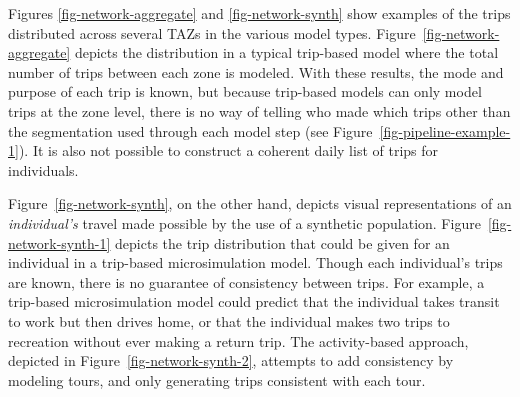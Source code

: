 \documentclass[fancy, twoside, mastersfancy, ms]{byuthesis}
\begin{document}
Figures \ref{fig-network-aggregate} and \ref{fig-network-synth} show
examples of the trips distributed across several TAZs in the various
model types. Figure~\ref{fig-network-aggregate} depicts the distribution
in a typical trip-based model where the total number of trips between
each zone is modeled. With these results, the mode and purpose of each
trip is known, but because trip-based models can only model trips at the
zone level, there is no way of telling who made which trips other than
the segmentation used through each model step (see
Figure~\ref{fig-pipeline-example-1}). It is also not possible to
construct a coherent daily list of trips for individuals.

Figure~\ref{fig-network-synth}, on the other hand, depicts visual
representations of an \emph{individual's} travel made possible by the
use of a synthetic population. Figure~\ref{fig-network-synth-1} depicts
the trip distribution that could be given for an individual in a
trip-based microsimulation model. Though each individual's trips are
known, there is no guarantee of consistency between trips. For example,
a trip-based microsimulation model could predict that the individual
takes transit to work but then drives home, or that the individual makes
two trips to recreation without ever making a return trip. The
activity-based approach, depicted in Figure~\ref{fig-network-synth-2},
attempts to add consistency by modeling tours, and only generating trips
consistent with each tour.
\end{document}
